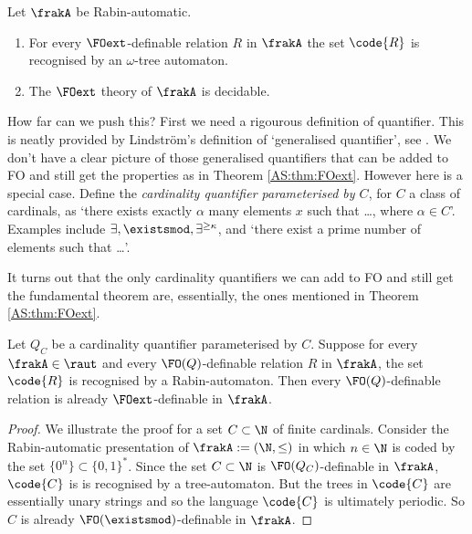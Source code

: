 \begin{theorem} \label{AS:thm:FOext}
Let $\frakA$ be Rabin-automatic.
\begin{enumerate}
\item For every $\FOext$-definable relation $R$ in $\frakA$ the set $\code{R}$ is recognised by an $\omega$-tree  automaton.
\item The $\FOext$ theory of $\frakA$ is decidable.
\end{enumerate}
\end{theorem}

How far can we push this? First we need a rigourous definition of quantifier.
This is neatly provided by Lindstr\"om's definition of `generalised quantifier',
see \cite{Lind66}. We don't have a clear picture of those generalised quantifiers that can
be added to FO and still get the properties as in Theorem \ref{AS:thm:FOext}.
However here is a special case. Define the
{\em cardinality quantifier parameterised by $C$}, for $C$  a class of
cardinals, as `there exists exactly $\alpha$ many elements $x$ such that \ldots,
where $\alpha \in C$'. Examples include $\exists, \existsmod,\exists^{\geq \kappa}$, and
`there exist a prime number of elements such that \dots'.

It turns out that the only cardinality quantifiers we can add to FO and still get the fundamental theorem are, essentially, 
the ones mentioned in Theorem \ref{AS:thm:FOext}.

\begin{theorem} 
Let $Q_C$ be a cardinality quantifier parameterised by $C$.  Suppose for every
$\frakA \in \raut$ and every $\FO(Q)$-definable relation $R$ in $\frakA$,
the set $\code{R}$ is recognised by a Rabin-automaton.  Then every $\FO(Q)$-definable relation 
is already $\FOext$-definable in $\frakA$. 
\end{theorem}


\begin{proof} 
We illustrate the proof for a set $C \subset \N$ of finite cardinals.
Consider the Rabin-automatic presentation of  $\frakA := (\N,\leq)$ in which $n \in \N$ is coded
by the set $\{0^n\} \subset \{0,1\}^\ast$. Since the set $C \subset \N$  is $\FO(Q_C)$-definable in $\frakA$, $\code{C}$ is
is recognised by a tree-automaton. But the trees in $\code{C}$ are essentially unary strings and so the language $\code{C}$ is ultimately periodic. So $C$ is already $\FO(\existsmod)$-definable in $\frakA$. 
\end{proof}

